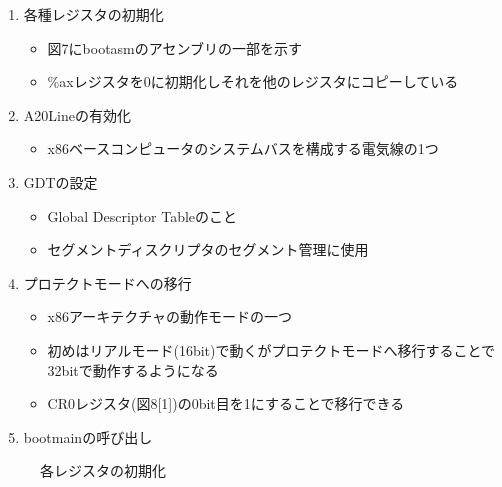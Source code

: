 \documentclass[submit,techreq,noauthor]{eco}	%
\begin{document}
\begin{enumerate}
	\renewcommand{\labelenumi}{\arabic{enumi}).}
	\item 各種レジスタの初期化
	      \begin{itemize}
		      \item 図7にbootasmのアセンブリの一部を示す
		      \item \%axレジスタを0に初期化しそれを他のレジスタにコピーしている
	      \end{itemize}
	\item A20Lineの有効化
	      \begin{itemize}
		      \item x86ベースコンピュータのシステムバスを構成する電気線の1つ
	      \end{itemize}
	\item GDTの設定
	      \begin{itemize}
		      \item Global Descriptor Tableのこと
		      \item セグメントディスクリプタのセグメント管理に使用
	      \end{itemize}
	\item プロテクトモードへの移行
	      \begin{itemize}
		      \item x86アーキテクチャの動作モードの一つ
		      \item 初めはリアルモード(16bit)で動くがプロテクトモードへ移行することで32bitで動作するようになる
		      \item CR0レジスタ(図8[1])の0bit目を1にすることで移行できる
	      \end{itemize}
	\item bootmainの呼び出し
\end{enumerate}

\begin{figure}[H]
	\centering
	\caption{各レジスタの初期化}
	\label{sample}
\end{figure}
\end{document}
